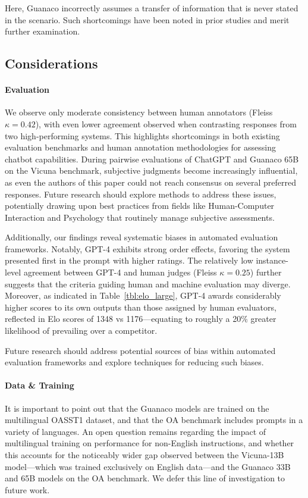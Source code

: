 Here, {Guanaco} incorrectly assumes a transfer of information that is never stated in the scenario. Such shortcomings have been noted in prior studies \cite{sap2022neural} and merit further examination.

\subsection{Considerations}
\label{ssec:considerations}

\paragraph{Evaluation}

We observe only moderate consistency between human annotators (Fleiss $\kappa=0.42$), with even lower agreement observed when contrasting responses from two high-performing systems. This highlights shortcomings in both existing evaluation benchmarks and human annotation methodologies for assessing chatbot capabilities. During pairwise evaluations of ChatGPT and {Guanaco} 65B on the Vicuna benchmark, subjective judgments become increasingly influential, as even the authors of this paper could not reach consensus on several preferred responses. Future research should explore methods to address these issues, potentially drawing upon best practices from fields like Human-Computer Interaction and Psychology that routinely manage subjective assessments.

Additionally, our findings reveal systematic biases in automated evaluation frameworks. Notably, GPT-4 exhibits strong order effects, favoring the system presented first in the prompt with higher ratings. The relatively low instance-level agreement between GPT-4 and human judges (Fleiss $\kappa=0.25$) further suggests that the criteria guiding human and machine evaluation may diverge. Moreover, as indicated in Table~\ref{tbl:elo_large}, GPT-4 awards considerably higher scores to its own outputs than those assigned by human evaluators, reflected in Elo scores of 1348 vs 1176—equating to roughly a 20\% greater likelihood of prevailing over a competitor.

Future research should address potential sources of bias within automated evaluation frameworks and explore techniques for reducing such biases.

\paragraph{Data \& Training} It is important to point out that the {Guanaco} models are trained on the multilingual OASST1 dataset, and that the OA benchmark includes prompts in a variety of languages. An open question remains regarding the impact of multilingual training on performance for non-English instructions, and whether this accounts for the noticeably wider gap observed between the Vicuna-13B model—which was trained exclusively on English data—and the {Guanaco} 33B and 65B models on the OA benchmark. We defer this line of investigation to future work.

